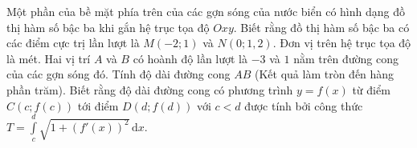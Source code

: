 \begin{ex}%
Một phần của bề mặt phía trên của các gợn sóng của nước biển có hình dạng đồ thị hàm số bậc ba khi gắn hệ trục tọa độ $Oxy$. Biết rằng đồ thị hàm số bậc ba có các điểm cực trị lần lượt là $M(-2;1)$ và $N(0;1{,}2)$. Đơn vị trên hệ trục tọa độ là mét. Hai vị trí $A$ và $B$ có hoành độ lần lượt là $-3$ và $1$ nằm trên đường cong của các gợn sóng đó. Tính độ dài đường cong $AB$ (Kết quả làm tròn đến hàng phần trăm). Biết rằng độ dài đường cong có phương trình $y=f(x)$ từ điểm $C(c;f(c))$ tới điểm $D(d;f(d))$ với $c<d$ được tính bởi công thức $T = \displaystyle\int\limits_{c}^{d} \sqrt{1+(f'(x))^2} \mathrm{\,d}x$.

\par {}
\end{ex}

